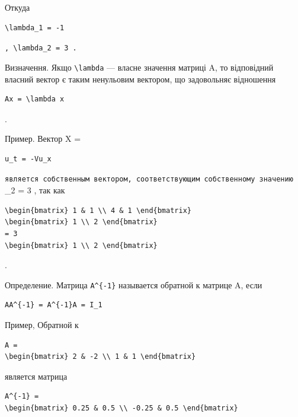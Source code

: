 \documentclass[
  ukrainian,
]{article}
\begin{document}
Откуда

\begin{verbatim}
\lambda_1 = -1
\end{verbatim}

\texttt{,\ \textquotesingle{}\textbackslash{}lambda\_2\ =\ 3\textquotesingle{}\ .}

Визначення. Якщо \texttt{\textbackslash{}lambda} --- власне значення
матриці A, то відповідний власний вектор є таким ненульовим вектором, що
задовольняє відношення

\begin{verbatim}
Ax = \lambda x
\end{verbatim}

.

Пример. Вектор X =

\begin{verbatim}
u_t = -Vu_x
\end{verbatim}

\texttt{является\ собственным\ вектором,\ соответствующим\ собственному\ значению}
\lambda\_2 = 3 , так как

\begin{verbatim}
\begin{bmatrix} 1 & 1 \\ 4 & 1 \end{bmatrix}
\begin{bmatrix} 1 \\ 2 \end{bmatrix}
= 3
\begin{bmatrix} 1 \\ 2 \end{bmatrix}
\end{verbatim}

.

Определение. Матрица \texttt{A\^{}\{-1\}} называется обратной к матрице
A, если

\begin{verbatim}
AA^{-1} = A^{-1}A = I_1
\end{verbatim}

Пример, Обратной к

\begin{verbatim}
A =
\begin{bmatrix} 2 & -2 \\ 1 & 1 \end{bmatrix}
\end{verbatim}

является матрица

\begin{verbatim}
A^{-1} =
\begin{bmatrix} 0.25 & 0.5 \\ -0.25 & 0.5 \end{bmatrix}
\end{verbatim}
\end{document}
